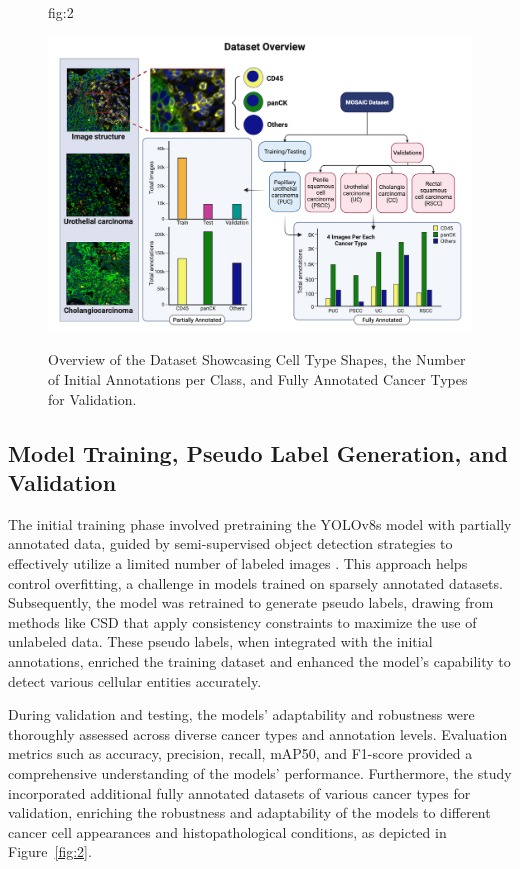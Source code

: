 \documentclass[anon]{midl} %
\begin{document}
\begin{figure}[htbp]
\floatconts
{fig:2}
{\caption{Overview of the Dataset Showcasing Cell Type Shapes, the Number of Initial Annotations per Class, and Fully Annotated Cancer Types for Validation.}}
{\includegraphics[width=1\linewidth]{images/2.png}}
\end{figure}


\subsection{Model Training, Pseudo Label Generation, and Validation}

The initial training phase involved pretraining the YOLOv8s model with partially annotated data, guided by semi-supervised object detection strategies to effectively utilize a limited number of labeled images \cite{gao2019note, jeong2019consistency}. This approach helps control overfitting, a challenge in models trained on sparsely annotated datasets. Subsequently, the model was retrained to generate pseudo labels, drawing from methods like CSD \cite{jeong2019consistency} that apply consistency constraints to maximize the use of unlabeled data. These pseudo labels, when integrated with the initial annotations, enriched the training dataset and enhanced the model's capability to detect various cellular entities accurately.

During validation and testing, the models' adaptability and robustness were thoroughly assessed across diverse cancer types and annotation levels. Evaluation metrics such as accuracy, precision, recall, mAP50, and F1-score provided a comprehensive understanding of the models' performance. Furthermore, the study incorporated additional fully annotated datasets of various cancer types for validation, enriching the robustness and adaptability of the models to different cancer cell appearances and histopathological conditions,  as depicted in Figure~\ref{fig:2}.
\end{document}
